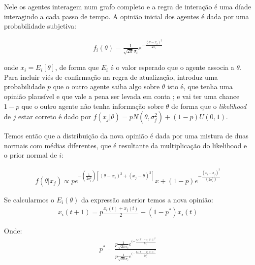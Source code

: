 Nele os agentes interagem num grafo completo e a regra de interação é uma díade
interagindo a cada passo de tempo. A opinião inicial dos agentes é dada por uma
probabilidade subjetiva:


\begin{align}
f_i(\theta) = \frac{1}{\sqrt{2 \pi} \sigma_i} e^{-
  \frac{(\theta - x_i )^2}{2 \sigma_i}}
  \end{align}

onde \(x_i = E_i[\theta] \), de forma que \(E_i\) é o valor esperado que o agente
associa a \(\theta\). Para incluir viés de confirmação na regra de atualização,
 introduz uma probabilidade \(p\) que o outro
agente saiba algo sobre $\theta$ isto é, que tenha uma opinião plausível e que vale a
pena ser levada em conta ; e vai ter uma chance \(1 - p\) que o outro agente não
tenha informação sobre $\theta$ de forma que o \textit{likelihood} de $j$ estar
correto é dado por $ f(x_j|\theta) = p N(\theta,\sigma_j^2) + (1-p)U(0,1)$.

Temos então que a distribuição da nova opinião é dada por uma mistura
de duas normais com médias diferentes, que é resultante da
multiplicação do likelihood e o prior normal de $i$:
  
  \begin{align}
    f(\theta | x_j)
    \propto 
    p
    e^
    {-(\frac{1}{2\sigma_i^2})
    [(\theta - x_i)^2
    +
    (x_j - \theta )^2
    ]}x
    +
    (1-p)
    e^{-\frac{(x_i - x_j)^2}{(2 \sigma_i^2)}}
  \end{align}

 Se calcularmos o $E_i(\theta)$ da expressão anterior temos a nova opinião:
  \begin{align}
    x_i(t+1)
    =
    p
    \frac{x_i(t) + x_j(t)}{2}
    +
    (1-p^*)x_i(t)
  \end{align}

  Onde:
  \begin{align}
    p^*
    =
    \frac{
      p \frac{1}{\sqrt{2 \pi} \sigma_i}
      e^{(- \frac{x_i (t) - x_j (t))^2}{2 \sigma_i^2}}
    }{
      p
      \frac{1}{\sqrt{2 \pi} \sigma_i}
      e^{(- \frac{x_i (t) - x_j (t))^2}{2 \sigma_i^2}}
    }
  \end{align}

